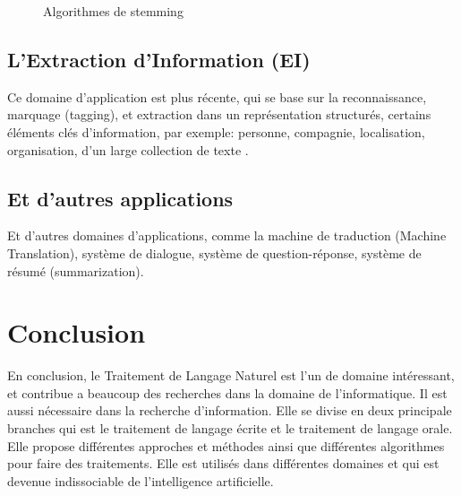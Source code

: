 \begin{figure}[htbp]
    \begin{center}
    \end{center}
    \caption{Algorithmes de stemming \citep{stemming-algorithms}}\label{fig:stemming-algorithms}
\end{figure}

\subsection*{L'Extraction d'Information (EI)}
Ce domaine d'application est plus récente, qui se base sur la reconnaissance, marquage (tagging), et extraction dans un représentation structurés, certains éléments clés d'information, par exemple: personne, compagnie, localisation, organisation, d'un large collection de texte \citep{automatic-nlp}.

\subsection*{Et d'autres applications}
Et d'autres domaines d'applications, comme la machine de traduction (Machine Translation), système de dialogue, système de question-réponse, système de résumé (summarization).

\section{Conclusion}
En conclusion, le Traitement de Langage Naturel est l'un de domaine intéressant, et contribue a beaucoup des recherches dans la domaine de l'informatique. Il est aussi nécessaire dans la recherche d'information. Elle se divise en deux principale branches qui est le traitement de langage écrite et le traitement de langage orale. Elle propose différentes approches et méthodes ainsi que différentes algorithmes pour faire des traitements. Elle est utilisés dans différentes domaines et qui est devenue indissociable de l'intelligence artificielle.